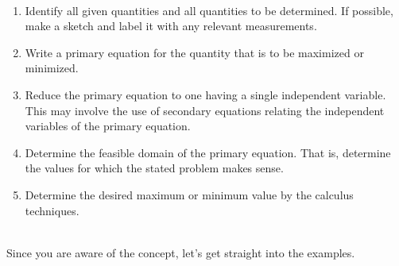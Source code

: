 \begin{proposition}\hfil~\\
    \begin{enumerate}
        \item Identify all given quantities and all quantities to be determined. If possible, make a sketch and label it with any relevant measurements.
        \item Write a primary equation for the quantity that is to be maximized or minimized. 
        \item Reduce the primary equation to one having a single independent variable. This may involve the use of secondary equations relating the independent variables of the primary equation.
        \item Determine the feasible domain of the primary equation. That is, determine the values for which the stated problem makes sense.
        \item Determine the desired maximum or minimum value by the calculus techniques.
    \end{enumerate}
\end{proposition}
~\\
Since you are aware of the concept, let's get straight into the examples.
\clearpage

